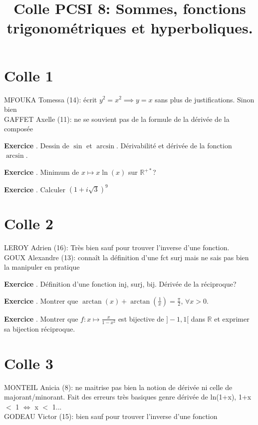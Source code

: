 \documentclass[10pt,a4paper]{article}
\title{Colle PCSI 8: Sommes, fonctions trigonométriques et hyperboliques.}
\newcounter{question}
\newcounter{exo}
\newenvironment{exo}{\vspace{0.5cm}\setcounter{question}{0}\addtocounter{exo}{1} \noindent \textbf{Exercice \theexo}. \normalsize }{\par}
\begin{document}
	\maketitle
	
	
	\section*{Colle 1}
	\setcounter{exo}{0}
	MFOUKA Tomessa (14): écrit $y^2 = x^2 \implies y = x$ sans plus de justifications. Sinon bien\\
	GAFFET Axelle (11): ne se souvient pas de la formule de la dérivée de la composée\\
	
	\begin{exo}
		Dessin de $\sin$ et $\arcsin$. Dérivabilité et dérivée de la fonction $\arcsin$. 
	\end{exo}

	\begin{exo}
		Minimum de $x \longmapsto x \ln(x)$ sur $\mathbb{R}^{+*}$?
	\end{exo}

	\begin{exo}
		Calculer $(1 + i\sqrt{3})^9$
	\end{exo}


	\section*{Colle 2}
	\setcounter{exo}{0}
	LEROY Adrien (16): Très bien sauf pour trouver l'inverse d'une fonction.\\
	GOUX Alexandre (13): connaît la définition d'une fct surj mais ne sais pas bien la manipuler en pratique\\
	
	\begin{exo}
	    Définition d'une fonction inj, surj, bij. Dérivée de la réciproque?
	\end{exo}
		
	\begin{exo}
		Montrer que $\arctan(x) + \arctan(\frac{1}{x}) = \frac{\pi}{2}$, $\forall x > 0$.
	\end{exo}
	
	\begin{exo}
		Montrer que $f: x \longmapsto \frac{x}{1-x^2}$ est bijective de $]-1, 1[$ dans $\mathbb{R}$ et exprimer sa bijection réciproque.
	\end{exo}	
			
	\section*{Colle 3}
	\setcounter{exo}{0}
	MONTEIL Anicia (8): ne maitrise pas bien la notion de dérivée ni celle de majorant/minorant. Fait des erreurs très basiques genre dérivée de ln(1+x), 1+x $<$ 1 $\Leftrightarrow$ x $<$ 1...\\
	GODEAU Victor (15): bien sauf pour trouver l'inverse d'une fonction\\
	
\end{document}
